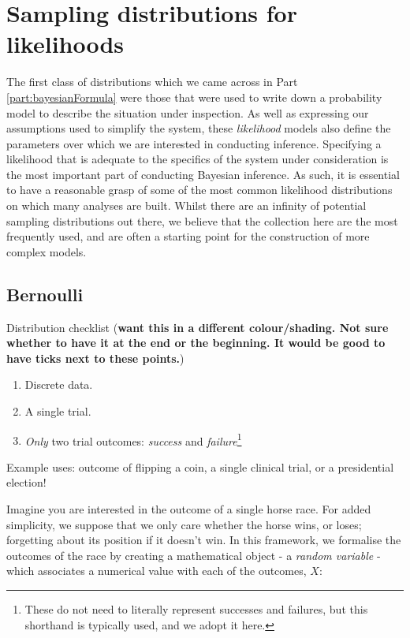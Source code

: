 \documentclass[11pt,fullpage]{book}
\begin{document}
\section{Sampling distributions for likelihoods}\label{sec:Distributions_samplingDist}
The first class of distributions which we came across in Part \ref{part:bayesianFormula} were those that were used to write down a probability model to describe the situation under inspection. As well as expressing our assumptions used to simplify the system, these \textit{likelihood} models also define the parameters over which we are interested in conducting inference. Specifying a likelihood that is adequate to the specifics of the system under consideration is the most important part of conducting Bayesian inference. As such, it is essential to have a reasonable grasp of some of the most common likelihood distributions on which many analyses are built. Whilst there are an infinity of potential sampling distributions out there, we believe that the collection here are the most frequently used, and are often a starting point for the construction of more complex models.

\subsection{Bernoulli}\label{sec:Distributions_bernoulli}

Distribution checklist (\textbf{want this in a different colour/shading. Not sure whether to have it at the end or the beginning. It would be good to have ticks next to these points.})

\begin{enumerate}
\item Discrete data.
\item A single trial.
\item \textit{Only} two trial outcomes: \textit{success} and \textit{failure}\footnote{These do not need to literally represent successes and failures, but this shorthand is typically used, and we adopt it here.}
\end{enumerate}

Example uses: outcome of flipping a coin, a single clinical trial, or a presidential election!

Imagine you are interested in the outcome of a single horse race. For added simplicity, we suppose that we only care whether the horse wins, or loses; forgetting about its position if it doesn't win. In this framework, we formalise the outcomes of the race by creating a mathematical object - a \textit{random variable} - which associates a numerical value with each of the outcomes, $X$:
\end{document}
